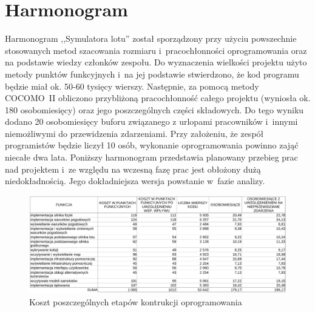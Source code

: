 \documentclass{mwrep}
\begin{document}
\chapter{Harmonogram}
Harmonogram ,,Symulatora lotu'' został sporządzony przy użyciu powszechnie stosowanych metod szacowania rozmiaru i~pracochłonności oprogramowania oraz na podstawie wiedzy członków zespołu. Do wyznaczenia wielkości projektu użyto metody punktów funkcyjnych i~na jej podstawie stwierdzono, że kod programu będzie miał ok. 50-60 tysięcy wierszy. Następnie, za pomocą metody COCOMO~II obliczono przybliżoną pracochłonność całego projektu (wyniosła ok. 180 osobomiesięcy) oraz jego poszczególnych części składowych. Do tego wyniku dodano 20 osobomiesięcy buforu związanego z urlopami pracowników i~innymi niemożliwymi do przewidzenia zdarzeniami. Przy założeniu, że zespół programistów będzie liczył 10 osób, wykonanie oprogramowania powinno zająć niecałe dwa lata.
Poniższy harmonogram przedstawia planowany przebieg prac nad projektem i~ze względu na wczesną fazę prac jest obłożony dużą niedokładnością. Jego dokładniejsza wersja powstanie w~fazie analizy.

\vspace{2cm}

\begin{figure}[!h]
    \centerline{\includegraphics*[scale=0.70]{punkty-funkcyjne-crop.pdf}}
    \caption{Koszt poszczególnych etapów kontrukcji oprogramowania}
\end{figure}
\end{document}
